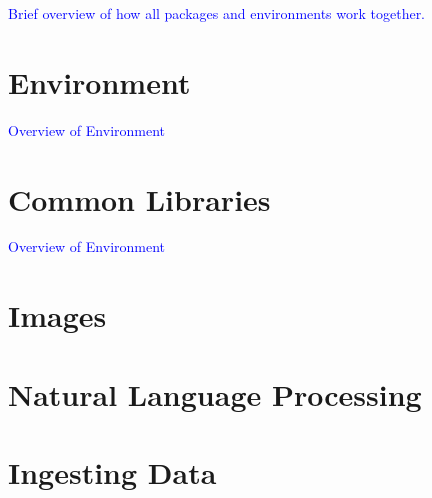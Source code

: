 

\textcolor{blue}{Brief overview of how all packages and environments work together.}

\chapter{Environment}

\textcolor{blue}{Overview of Environment}

















\chapter{Common Libraries}

\textcolor{blue}{Overview of Environment}




\chapter{Images}



\chapter{Natural Language Processing}




\chapter{Ingesting Data}









